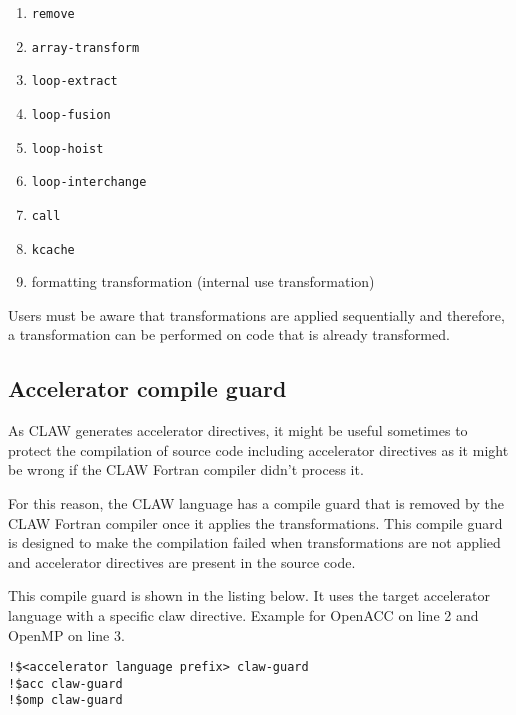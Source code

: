 \documentclass{article}
\begin{document}
\begin{enumerate}
\item \lstinline!remove!
\item \lstinline!array-transform!
\item \lstinline!loop-extract!
\item \lstinline!loop-fusion!
\item \lstinline!loop-hoist!
\item \lstinline!loop-interchange!
\item \lstinline!call!
\item \lstinline!kcache!
\item formatting transformation (internal use transformation)
\end{enumerate}

Users must be aware that transformations are applied sequentially and
therefore, a transformation can be performed on code that is already transformed.

\subsection{Accelerator compile guard}
As CLAW generates accelerator directives, it might be useful sometimes to protect the compilation of source code including accelerator directives as it might be wrong if the CLAW Fortran compiler didn't process it. 

For this reason, the CLAW language has a compile guard that is removed by the CLAW Fortran compiler once it applies the transformations. This compile guard is designed to make the compilation failed when transformations are not applied and accelerator directives are present in the source code. 

This compile guard is shown in the listing below. It uses the target accelerator language with a specific claw directive. Example for OpenACC on line 2 and OpenMP on line 3. 

\begin{lstlisting}
!$<accelerator language prefix> claw-guard 
!$acc claw-guard
!$omp claw-guard
\end{lstlisting}






\appendix

\end{document}
